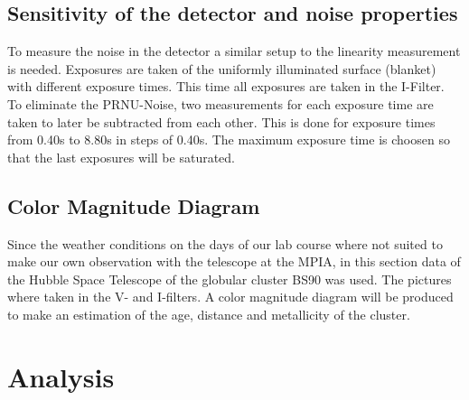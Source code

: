 \documentclass[12pt]{article}
\begin{document}
\subsection{Sensitivity of the detector and noise properties}
	To measure the noise in the detector a similar setup to the linearity measurement is needed. Exposures are taken of the uniformly illuminated surface (blanket) with different exposure times. This time all exposures are taken in the I-Filter. To eliminate the PRNU-Noise, two measurements for each exposure time are taken to later be subtracted from each other. This is done for exposure times from 0.40s to 8.80s in steps of 0.40s. The maximum exposure time is choosen so that the last exposures will be saturated. 
\subsection{Color Magnitude Diagram}
	Since the weather conditions on the days of our lab course where not suited to make our own observation with the telescope at the MPIA, in this section data of the Hubble Space Telescope of the globular cluster BS90 was used. The pictures where taken in the V- and I-filters. A color magnitude diagram will be produced to make an estimation of the age, distance and metallicity of the cluster.

\section{Analysis}
\end{document}
